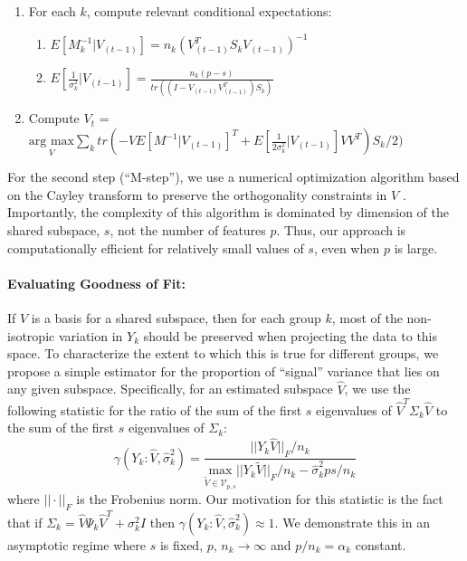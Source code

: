 \documentclass[12pt]{article}
\begin{document}
\begin{enumerate}
\item For each $k$, compute relevant conditional expectations:
\begin{enumerate}
\item $E[M_k^{-1} | V_{(t-1)}] = n_k(V_{(t-1)}^T S_kV_{(t-1)})^{-1}$
\item $E[\frac{1}{\sigma_k^2}|V_{(t-1)}] = \frac{n_k(p-s)}{tr((I-V_{(t-1)}V_{(t-1)}^T)S_k)}$
\end{enumerate}
\item Compute $V_{t}$ = $\underset{V}{\text{arg } \text{max}}  \sum_k tr\left(-VE[M^{-1}|V_{(t-1)}]^T +
       E[\frac{1}{2\sigma_k^2}|V_{(t-1)}]VV^T\right)S_k/2)$ 
\end{enumerate}

For the second step (``M-step''), we use a numerical optimization algorithm based on
the Cayley transform to preserve the orthogonality constraints in $V$
\citep{Wen2013}.  Importantly, the complexity of this algorithm is
dominated by dimension of the shared subspace, $s$, not the number of
features $p$.  Thus, our approach is computationally efficient for
relatively small values of $s$, even when $p$ is large.

\paragraph{Evaluating Goodness of Fit:}

If $V$ is a basis for a shared subspace, then for each group $k$, most
of the non-isotropic variation in $Y_k$ should be preserved when projecting the data
to this space.  To characterize the extent to which this is true for
different groups, we propose a simple estimator for the proportion of
``signal'' variance that lies on any given subspace.  Specifically,
for an estimated subspace $\hat{V}$, we use the following statistic
for the ratio of the sum of the first $s$ eigenvalues of
$\hat{V}^T \Sigma_k \hat{V}$ to the sum of the first $s$
eigenvalues of $\Sigma_k$:
%
\begin{equation}
\gamma(Y_k: \hat{V}, \hat{\sigma}_k^2) = \frac{||Y_k\hat{V}||_F/n_k}{\underset{\widetilde{V} \in \mathcal{V}_{p, s}}{\text{max}}
  ||Y_k\widetilde{V}||_F/n_k - \hat{\sigma}_k^2ps/n_k}
\label{eqn:ratio}
\end{equation}
%
\noindent where $||\cdot||_F$ is the Frobenius norm. Our motivation for
this statistic is the fact that if
$\Sigma_k = \hat{V}\Psi_k\hat{V}^T + \sigma_k^2I$ then
$\gamma(Y_k: \hat{V}, \hat{\sigma}_k^2) \approx 1$.  We demonstrate
this in an asymptotic regime where $s$ is fixed, $p$,
$n_k \rightarrow \infty$ and $p/n_k = \alpha_k$ constant.
\end{document}
